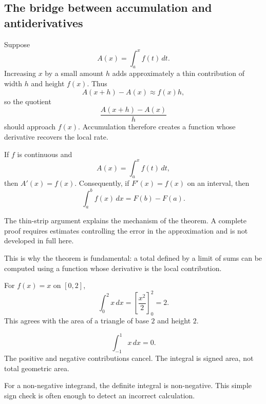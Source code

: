 \subsection{The bridge between accumulation and antiderivatives}

Suppose
\[
A(x)=\int_a^x f(t)\,dt.
\]
Increasing $x$ by a small amount $h$ adds approximately a thin contribution of width $h$ and height $f(x)$. Thus
\[
A(x+h)-A(x)\approx f(x)h,
\]
so the quotient
\[
\frac{A(x+h)-A(x)}{h}
\]
should approach $f(x)$. Accumulation therefore creates a function whose derivative recovers the local rate.

\begin{theorembox}
If $f$ is continuous and
\[
A(x)=\int_a^x f(t)\,dt,
\]
then $A'(x)=f(x)$. Consequently, if $F'(x)=f(x)$ on an interval, then
\[
\int_a^b f(x)\,dx=F(b)-F(a).
\]
\end{theorembox}

\begin{remarkbox}
The thin-strip argument explains the mechanism of the theorem. A complete proof requires estimates controlling the error in the approximation and is not developed in full here.
\end{remarkbox}

This is why the theorem is fundamental: a total defined by a limit of sums can be computed using a function whose derivative is the local contribution.

\begin{examplebox}
For $f(x)=x$ on $[0,2]$,
\[
\int_0^2 x\,dx=\left[\frac{x^2}{2}\right]_0^2=2.
\]
This agrees with the area of a triangle of base $2$ and height $2$.
\end{examplebox}

\begin{examplebox}
\[
\int_{-1}^{1}x\,dx=0.
\]
The positive and negative contributions cancel. The integral is signed area, not total geometric area.
\end{examplebox}

For a non-negative integrand, the definite integral is non-negative. This simple sign check is often enough to detect an incorrect calculation.
